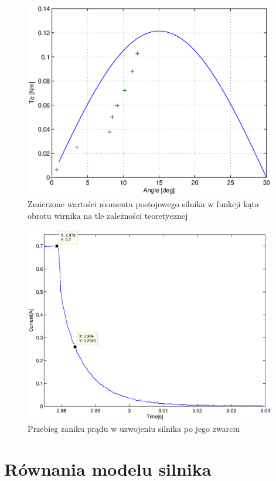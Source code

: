 \documentclass[12pt]{article}
\begin{document}
\begin{figure}[!htb]
	\begin{center}
		\includegraphics[width=11cm]{../res/img/mom_f-fi.eps}
	\end{center}
	\caption{Zmierzone wartości momentu postojowego silnika w funkcji kąta obrotu
	wirnika na tle zależności teoretycznej}
\end{figure}

\begin{figure}[!htb]
	\begin{center}
		\includegraphics[width=11cm]{../res/img/Acurr.eps}
	\end{center}
	\caption{Przebieg zaniku prądu w uzwojeniu silnika po jego zwarciu}
\end{figure}

\clearpage

\section{Równania modelu silnika}
\end{document}
